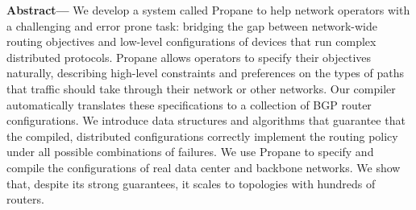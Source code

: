\documentclass{sig-alternate-10pt}
\newcommand{\sysname}{{\small \sf Propane}\xspace}
\providecommand{\DIFadd}[1]{{\protect\color{blue}\uwave{#1}}} %
\providecommand{\DIFaddbegin}{} %
\providecommand{\DIFaddend}{} %
\begin{document}

\textbf{Abstract---}
We develop a system called \sysname to help network operators with a challenging and error prone task: bridging the gap between network-wide routing objectives and low-level configurations of devices that run complex distributed protocols.
%
\sysname allows operators to specify their objectives naturally, describing high-level constraints and preferences on the types of paths that traffic should take through their network or other networks.
%
Our compiler automatically translates these specifications to a collection of BGP router configurations.
%
We introduce data structures and algorithms that guarantee that the compiled, distributed configurations correctly implement the routing policy under all possible combinations of failures.
%
We use \sysname to specify and compile the configurations of real
data center and backbone networks.  We show that, despite its strong guarantees, it scales to topologies with hundreds \DIFaddbegin \DIFadd{to thousands }\DIFaddend of routers.
\end{document}
